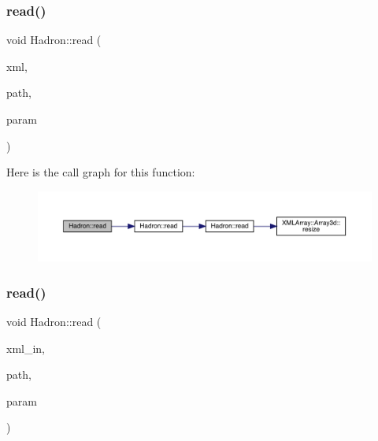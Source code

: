 \subsubsection{\texorpdfstring{read()}{read()}\hspace{0.1cm}{\footnotesize\ttfamily [35/94]}}
{\footnotesize\ttfamily void Hadron\+::read (\begin{DoxyParamCaption}\item[{\mbox{\hyperlink{classADATXML_1_1XMLReader}{X\+M\+L\+Reader}} \&}]{xml,  }\item[{const std\+::string \&}]{path,  }\item[{\mbox{\hyperlink{structHadron_1_1KeySingleHadronQuarkSpin__t}{Key\+Single\+Hadron\+Quark\+Spin\+\_\+t}} \&}]{param }\end{DoxyParamCaption})}

Here is the call graph for this function\+:
\nopagebreak
\begin{figure}[H]
\begin{center}
\leavevmode
\includegraphics[width=350pt]{d1/daf/namespaceHadron_a35b28e298745916c37daa929a874e099_cgraph}
\end{center}
\end{figure}
\mbox{\label{namespaceHadron_ae5cdeeff0a8ced82bfb5f5a46595faf8}} 
\subsubsection{\texorpdfstring{read()}{read()}\hspace{0.1cm}{\footnotesize\ttfamily [36/94]}}
{\footnotesize\ttfamily void Hadron\+::read (\begin{DoxyParamCaption}\item[{\mbox{\hyperlink{classADATXML_1_1XMLReader}{X\+M\+L\+Reader}} \&}]{xml\+\_\+in,  }\item[{const std\+::string \&}]{path,  }\item[{\mbox{\hyperlink{structHadron_1_1HadronDiagramTimeSlices__t}{Hadron\+Diagram\+Time\+Slices\+\_\+t}} \&}]{param }\end{DoxyParamCaption})}

